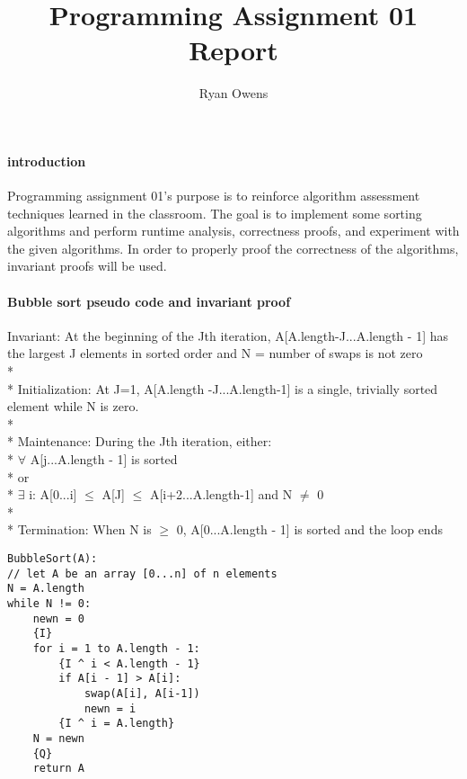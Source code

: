 \documentclass[10pt,letterpaper]{report}
\author{Ryan Owens}
\title{Programming Assignment 01 Report}
\begin{document}
\paragraph{introduction}
	Programming assignment 01's purpose is to reinforce algorithm assessment techniques learned in the classroom.  The goal is to implement some sorting algorithms and perform runtime analysis, correctness proofs, and experiment with the given algorithms. In order to properly proof the correctness of the algorithms, invariant proofs will be used. 
\paragraph{Bubble sort pseudo code and invariant proof}
	Invariant: At the beginning of the Jth iteration, A[A.length-J...A.length - 1] has the largest J elements in sorted order and N = number of swaps is not zero
	\\*
	\\* Initialization: At J=1, A[A.length -J...A.length-1] is a single, trivially sorted element while N is zero.
	\\*
	\\* Maintenance: During the Jth iteration, either:
	\\* $ \forall $ A[j...A.length - 1]  is sorted 
	\\* or
	\\* $ \exists$ i: A[0...i] $\leq$ A[J] $\leq$ A[i+2...A.length-1]  and N $\neq $ 0
	\\*
	\\* Termination: When N is $\geq$ 0, A[0...A.length - 1] is sorted and the loop ends
		\begin{lstlisting}
BubbleSort(A):
// let A be an array [0...n] of n elements
N = A.length
while N != 0:
	newn = 0
	{I}
	for i = 1 to A.length - 1:
		{I ^ i < A.length - 1}
		if A[i - 1] > A[i]:
			swap(A[i], A[i-1])
			newn = i
		{I ^ i = A.length}
	N = newn
	{Q}
	return A
			\end{lstlisting}
\end{document}
